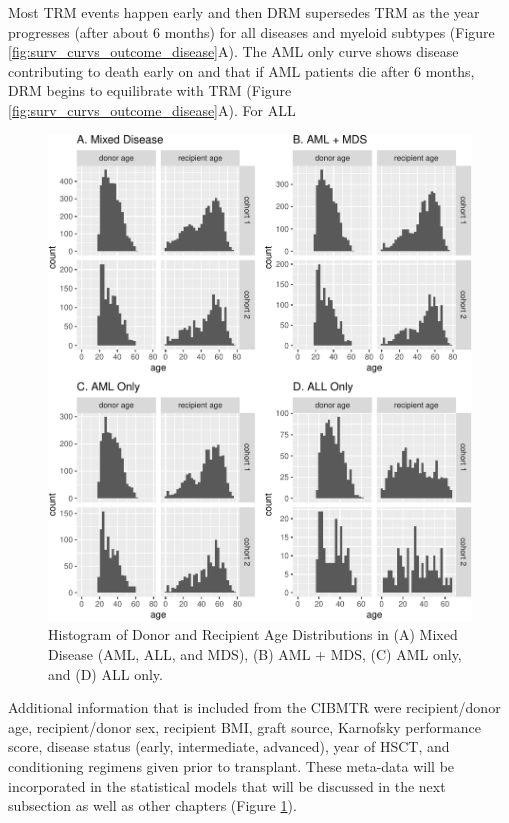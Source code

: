 \documentclass[]{DissertateOSU}
\begin{document}
Most TRM events happen early and then DRM supersedes TRM as the year
progresses (after about 6 months) for all diseases and myeloid subtypes
(Figure \ref{fig:surv_curvs_outcome_disease}A). The AML only curve shows
disease contributing to death early on and that if AML patients die
after 6 months, DRM begins to equilibrate with TRM (Figure
\ref{fig:surv_curvs_outcome_disease}A). For ALL

\begin{figure}
\centering
\includegraphics{figures/unnamed-chunk-16-1.pdf}
\caption{\label{fig:age_histograms} Histogram of Donor and Recipient Age
Distributions in (A) Mixed Disease (AML, ALL, and MDS), (B) AML + MDS,
(C) AML only, and (D) ALL only.}
\end{figure}

Additional information that is included from the CIBMTR were
recipient/donor age, recipient/donor sex, recipient BMI, graft source,
Karnofsky performance score, disease status (early, intermediate,
advanced), year of HSCT, and conditioning regimens given prior to
transplant. These meta-data will be incorporated in the statistical
models that will be discussed in the next subsection as well as other
chapters (Figure \ref{fig:age_histograms}).
\end{document}
